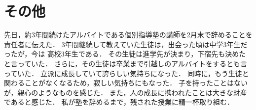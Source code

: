\documentclass[fleqn, 14pt]{extarticle}
\begin{document}
\section{その他}
先日，約3年間続けたアルバイトである個別指導塾の講師を2月末で辞めることを
責任者に伝えた．
3年間継続して教えていた生徒は，出会った頃は中学3年生だったが，今は
高校3年生である．
その生徒は進学先が決まり，下宿先も決めたと言っていた．
さらに，その生徒は卒業まで引越しのアルバイトをするとも言っていた．
立派に成長していて誇らしい気持ちになった．
同時に，もう生徒と関わることがなくなるため，寂しい気持ちにもなった．
子を持ったことはないが，親心のようなものを感じた．
また，人の成長に携われたことは大きな財産であると感じた．
私が塾を辞めるまで，残された授業に精一杯取り組む．
\end{document}
